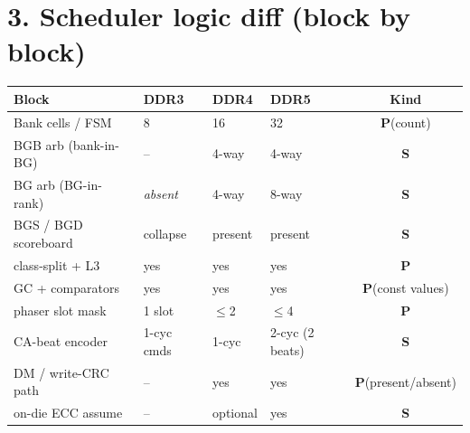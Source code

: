 \documentclass[10pt]{article}
\renewcommand{\P}{\textbf{\textcolor{para}{P}}}
\newcommand{\Su}{\textbf{\textcolor{stru}{S}}}
\begin{document}
\section*{3. Scheduler logic diff (block by block)}
{\footnotesize
\begin{longtable}{>{\raggedright\arraybackslash}p{3.4cm} p{2.2cm} p{2.2cm} p{2.6cm} c}
\toprule
\textbf{Block} & \textbf{DDR3} & \textbf{DDR4} & \textbf{DDR5} & \textbf{Kind}\\
\midrule\endhead
Bank cells / FSM   & 8            & 16          & 32            & \P (count)\\
BGB arb (bank-in-BG) & --         & 4-way       & 4-way         & \Su\\
BG arb (BG-in-rank)  & \emph{absent} & 4-way    & 8-way         & \Su\\
BGS / BGD scoreboard & collapse   & present     & present       & \Su\\
class-split + L3     & yes         & yes         & yes           & \P\\
GC + comparators     & yes         & yes         & yes           & \P (const values)\\
phaser slot mask     & 1 slot      & $\le$2      & $\le$4        & \P\\
CA-beat encoder      & 1-cyc cmds  & 1-cyc       & 2-cyc (2 beats) & \Su\\
DM / write-CRC path  & --          & yes         & yes           & \P (present/absent)\\
on-die ECC assume    & --          & optional    & yes           & \Su\\
\bottomrule
\end{longtable}}
\end{document}
